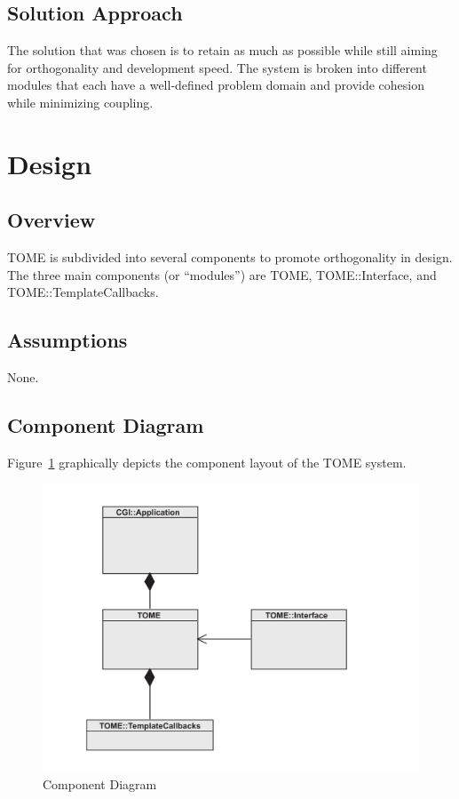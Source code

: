 \documentclass[12pt,titlepage]{article}
\begin{document}
\subsection{Solution Approach}
The solution that was chosen is to retain as much as possible while still aiming for orthogonality and development speed.  The system is broken into different modules that each have a well-defined problem domain and provide cohesion while minimizing coupling.
\section{Design}
\subsection{Overview}
TOME is subdivided into several components to promote orthogonality in design.  The three main components (or ``modules'') are TOME, TOME::Interface, and TOME::TemplateCallbacks.
\subsection{Assumptions}
None.
\subsection{Component Diagram}
Figure~\ref{ComponentDiagram} graphically depicts the component layout of the TOME system.
\begin{figure}[h]
	\includegraphics[width=\textwidth]{ComponentDiagram}
	\caption{Component Diagram}
	\label{ComponentDiagram}
\end{figure}
\end{document}
